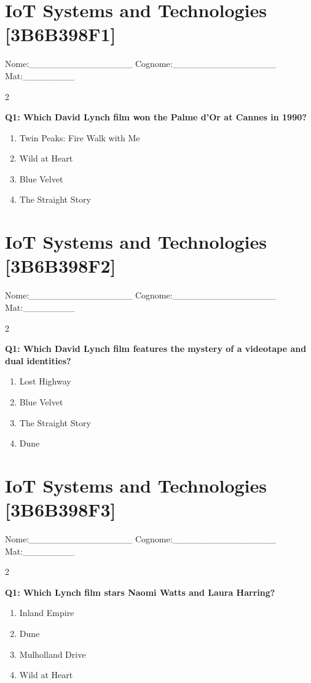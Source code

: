 \documentclass[10pt]{article}
\begin{document}
\section*{IoT Systems and Technologies \footnotesize [3B6B398F1]}
{\footnotesize Nome:\_\_\_\_\_\_\_\_\_\_\_\_\_\_\_\_ Cognome:\_\_\_\_\_\_\_\_\_\_\_\_\_\_\_\_ Mat:\_\_\_\_\_\_\_\_}
\begin{multicols}{2}

\textbf{Q1: Which David Lynch film won the Palme d'Or at Cannes in 1990?}

\begin{enumerate}[label=\arabic*.]
\item Twin Peaks: Fire Walk with Me
\item Wild at Heart
\item Blue Velvet
\item The Straight Story
\end{enumerate}
\end{multicols}

\newpage

\section*{IoT Systems and Technologies \footnotesize [3B6B398F2]}
{\footnotesize Nome:\_\_\_\_\_\_\_\_\_\_\_\_\_\_\_\_ Cognome:\_\_\_\_\_\_\_\_\_\_\_\_\_\_\_\_ Mat:\_\_\_\_\_\_\_\_}
\begin{multicols}{2}

\textbf{Q1: Which David Lynch film features the mystery of a videotape and dual identities?}

\begin{enumerate}[label=\arabic*.]
\item Lost Highway
\item Blue Velvet
\item The Straight Story
\item Dune
\end{enumerate}
\end{multicols}

\newpage

\section*{IoT Systems and Technologies \footnotesize [3B6B398F3]}
{\footnotesize Nome:\_\_\_\_\_\_\_\_\_\_\_\_\_\_\_\_ Cognome:\_\_\_\_\_\_\_\_\_\_\_\_\_\_\_\_ Mat:\_\_\_\_\_\_\_\_}
\begin{multicols}{2}

\textbf{Q1: Which Lynch film stars Naomi Watts and Laura Harring?}

\begin{enumerate}[label=\arabic*.]
\item Inland Empire
\item Dune
\item Mulholland Drive
\item Wild at Heart
\end{enumerate}
\end{multicols}
\end{document}
